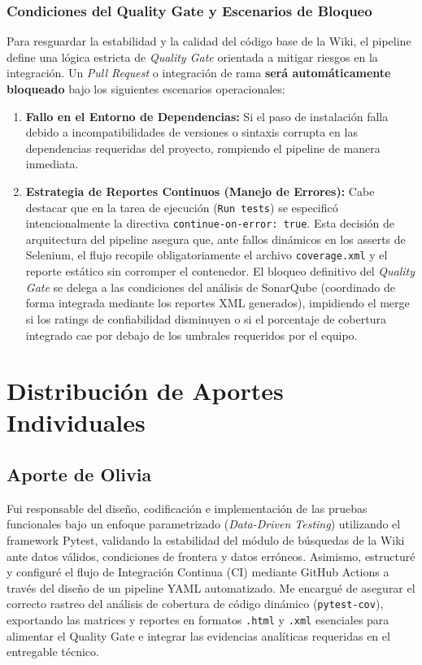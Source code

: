 \documentclass[12pt,letterpaper]{article}
\begin{document}
\subsubsection{Condiciones del Quality Gate y Escenarios de Bloqueo}
Para resguardar la estabilidad y la calidad del código base de la Wiki, el pipeline define una lógica estricta de \textit{Quality Gate} orientada a mitigar riesgos en la integración. Un \textit{Pull Request} o integración de rama \textbf{será automáticamente bloqueado} bajo los siguientes escenarios operacionales:
\begin{enumerate}
    \item \textbf{Fallo en el Entorno de Dependencias:} Si el paso de instalación falla debido a incompatibilidades de versiones o sintaxis corrupta en las dependencias requeridas del proyecto, rompiendo el pipeline de manera inmediata.
    \item \textbf{Estrategia de Reportes Continuos (Manejo de Errores):} Cabe destacar que en la tarea de ejecución (\texttt{Run tests}) se especificó intencionalmente la directiva \texttt{continue-on-error: true}. Esta decisión de arquitectura del pipeline asegura que, ante fallos dinámicos en los asserts de Selenium, el flujo recopile obligatoriamente el archivo \texttt{coverage.xml} y el reporte estático sin corromper el contenedor. El bloqueo definitivo del \textit{Quality Gate} se delega a las condiciones del análisis de SonarQube (coordinado de forma integrada mediante los reportes XML generados), impidiendo el merge si los ratings de confiabilidad disminuyen o si el porcentaje de cobertura integrado cae por debajo de los umbrales requeridos por el equipo.
\end{enumerate}

\newpage

\section{Distribución de Aportes Individuales}

\subsection{Aporte de Olivia}
Fui responsable del diseño, codificación e implementación de las pruebas funcionales bajo un enfoque parametrizado (\textit{Data-Driven Testing}) utilizando el framework Pytest, validando la estabilidad del módulo de búsquedas de la Wiki ante datos válidos, condiciones de frontera y datos erróneos. Asimismo, estructuré y configuré el flujo de Integración Continua (CI) mediante GitHub Actions a través del diseño de un pipeline YAML automatizado. Me encargué de asegurar el correcto rastreo del análisis de cobertura de código dinámico (\texttt{pytest-cov}), exportando las matrices y reportes en formatos \texttt{.html} y \texttt{.xml} esenciales para alimentar el Quality Gate e integrar las evidencias analíticas requeridas en el entregable técnico.
\end{document}
